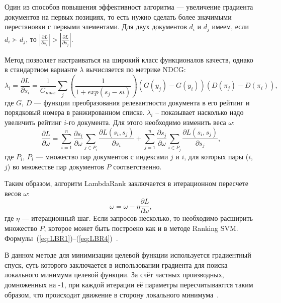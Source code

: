 Один из способов повышения эффективност алгоритма  --- увеличение градиента документов на первых позициях, то есть нужно сделать более значимыми  перестановки с первыми элементами. Для двух документов $d_{i}$ и $d_{j}$ имеем, если $d_{i} \succ d_{j}$, то $| \frac{\partial L}{\partial s_{i}} | > | \frac{\partial L}{\partial s_{j}} |$.

Метод позволяет настраиваться на широкий класс функционалов качеств, однако в стандартном варианте $\lambda$ вычисляется по метрике NDCG:
\begin{equation}
	\label{eq:LBR2}
	\lambda_{i} = \frac{\partial L}{\partial s_{i}} = \frac{1}{G_{max}} \sum_{j}(\frac{1}{1 + exp(s_{j} - s{i})})(G(y_{j}) - G(y_{i}))(D(\pi_{j}) - D(\pi_{i})),
\end{equation}
где  $G$, $D$ ---  функции преобразования релевантности документа в его рейтинг и порядковый номера  в ранжированном списке.  $\lambda_{i}$ – показывает насколько надо увеличить рейтинг $i$-го документа. Для этого необходимо изменить веса $\omega$:
\begin{equation}
	\label{eq:LBR3}
	\frac{\partial L}{\partial \omega} = \sum_{i=1}^{n}\frac{\partial s_{i}}{\partial \omega}\sum_{j \in P_{i}}\frac{\partial L(s_{i}, s_{j})}{\partial s_{i}} + \sum_{j=1}^{n}\frac{\partial s_{j}}{\partial \omega}\sum_{i \in P_{j}}\frac{\partial L(s_{i}, s_{j})}{\partial s_{j}},
\end{equation}
где $P_{i}$, $P_{i}$ --- множество пар документов с индексами $j$ и $i$, для которых пары ($i$, $j$) во множестве пар документов $P$ соответственно.

Таким образом, алгоритм LambdaRank заключается в итерационном пересчете весов $\omega$:
\begin{equation}
	\label{eq:LBR4}
	\omega = \omega - \eta\frac{\partial L}{\partial \omega},
\end{equation}
где $\eta$ --- итерационный шаг. Если запросов несколько, то необходимо расширить множество $P$, которое может быть построено как и в методе Ranking SVM. Формулы~(\ref{eq:LBR1})--(\ref{eq:LBR4})~\cite{LamdaRank}.

В данном методе для минимизации целевой функции используется градиентный спуск, суть которого заключается в использовании градиента для поиска локального минимума целевой функции. За счёт частных производных, домноженных на -1, при каждой итерации её параметры пересчитываются таким образом, что происходит движение в сторону локального минимума~\cite{ML_no_wors}.

